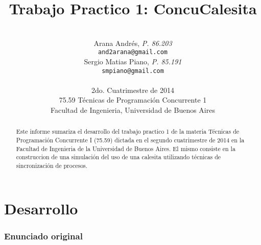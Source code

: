 \documentclass[a4paper,11pt]{article}
\title{\textbf{Trabajo Practico 1: ConcuCalesita}}
\author{\\
  Arana Andrés, \textit{P. 86.203}                                 \\
  \texttt{and2arana@gmail.com}                                     \\ [2.5ex]
  Sergio Matias Piano, \textit{P. 85.191}                          \\
  \texttt{smpiano@gmail.com}                                       \\ [2.5ex]
                                                                   \\
  \normalsize{2do. Cuatrimestre de 2014}                           \\
  \normalsize{75.59 Técnicas de Programación Concurrente 1}        \\
  \normalsize{Facultad de Ingenieria, Universidad de Buenos Aires} \\
}
\date{}
\begin{document}
\thispagestyle{empty}
\maketitle

\begin{abstract}

  Este informe sumariza el desarrollo del trabajo practico 1 de la materia
  Técnicas de Programación Concurrente I (75.59) dictada en el segundo
  cuatrimestre de 2014 en la Facultad de Ingenieria de la Universidad de Buenos
  Aires. El mismo consiste en la construccion de una simulación del uso de una
  calesita utilizando técnicas de sincronización de procesos.

\end{abstract}

\clearpage

\tableofcontents
\clearpage


\part{Desarrollo}

\section{Enunciado original}\label{sec:enunciado}

\end{document}
